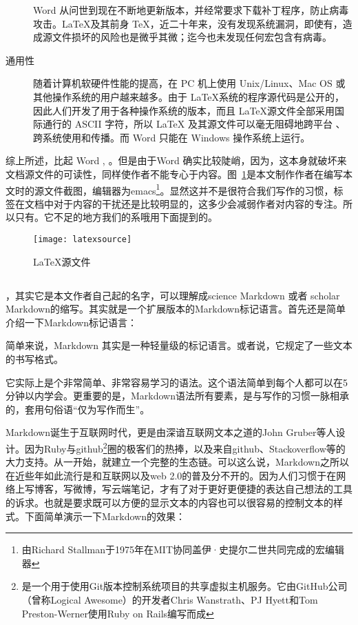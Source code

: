 \begin{description}
Word 从问世到现在不断地更新版本，并经常要求下载补丁程序，防止病毒攻击。\LaTeX 及其前身 \TeX，近二十年来，没有发现系统漏洞，即使有，造成源文件损坏的风险也是微乎其微；迄今也未发现任何宏包含有病毒。
\item[通用性] 随着计算机软硬件性能的提高，在 PC 机上使用 Unix/Linux、Mac OS 或其他操作系统的用户越来越多。由于 \LaTeX 系统的程序源代码是公开的，因此人们开发了用于各种操作系统的版本，而且 \LaTeX 源文件全部采用国际通行的 ASCII 字符，所以 LaTeX 及其源文件可以毫无阻碍地跨平台 、跨系统使用和传播。而 Word 只能在 Windows 操作系统上运行。
\end{description}
综上所述，比起 Word , 。但是由于 Word 确实比较陡峭，因为，这本身就破坏来文档源文件的可读性，同样使作者不能专心于内容。图~\ref{fig:xfig6}是本文制作作者在编写本文时的源文件截图，编辑器为emacs\footnote{由Richard Stallman于1975年在MIT协同盖伊·史提尔二世共同完成的宏编辑器}。显然这并不是很符合我们写作的习惯，标签在文档中对于内容的干扰还是比较明显的，这多少会减弱作者对内容的专注。所以只有。它不足的地方我们的系哦用下面提到的。
\begin{figure}[H]
  \centering
  \texttt{[image: latexsource]}
  \caption{LaTeX源文件}
  \label{fig:xfig6}
\end{figure}

\subsection{\smarkdown}
\label{sec:smarkdown}

，其实它是本文作者自己起的名字，可以理解成science Markdown 或者 scholar Markdown的缩写。其实就是一个扩展版本的Markdown标记语言。首先还是简单介绍一下Markdown标记语言：

简单来说，Markdown 其实是一种轻量级的标记语言。或者说，它规定了一些文本的书写格式。

它实际上是个非常简单、非常容易学习的语法。这个语法简单到每个人都可以在5分钟以内学会。更重要的是，Markdown语法所有要素，是与写作的习惯一脉相承的，套用句俗语“仅为写作而生”。

Markdown诞生于互联网时代，更是由深谙互联网文本之道的John Gruber等人设计。因为Ruby与github\footnote{是一个用于使用Git版本控制系统项目的共享虚拟主机服务。它由GitHub公司（曾称Logical Awesome）的开发者Chris Wanstrath、PJ Hyett和Tom Preston-Werner使用Ruby on Rails编写而成}圈的极客们的热捧，以及来自github、Stackoverflow等的大力支持。从一开始，就建立一个完整的生态链。可以这么说，Markdown之所以在近些年如此流行是和互联网以及web 2.0的普及分不开的。因为人们习惯于在网络上写博客，写微博，写云端笔记，才有了对于更好更便捷的表达自己想法的工具的诉求。也就是要求既可以方便的显示文本的内容也可以很容易的控制文本的样式。下面简单演示一下Markdown的效果：

